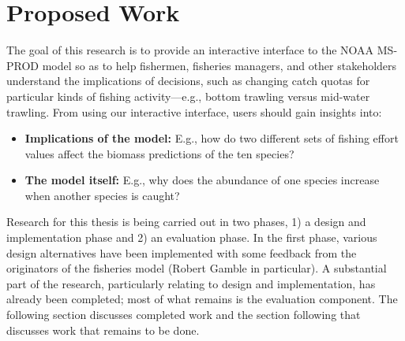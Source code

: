 \chapter{Proposed Work}

The goal of this research is to provide an interactive interface to the NOAA MS-PROD model so as to help fishermen, fisheries managers, and other stakeholders understand the implications of decisions, such as changing catch quotas for particular kinds of fishing activity---e.g., bottom trawling versus mid-water trawling.  From using our interactive interface, users should gain insights into:
\begin{itemize}
	\item \textbf{Implications of the model:}  E.g., how do two different sets of fishing effort values affect the biomass predictions of the ten species?
	\item \textbf{The model itself:}  E.g., why does the abundance of one species increase when another species is caught? 
\end{itemize}

Research for this thesis is being carried out in two phases, 1) a design and implementation phase and 2) an evaluation phase.  In the first phase, various design alternatives have been implemented with some feedback from the originators of the fisheries model (Robert Gamble in particular).  A substantial part of the research, particularly relating to design and implementation, has already been completed; most of what remains is the evaluation component.  The following section discusses completed work and the section following that discusses work that remains to be done.%





